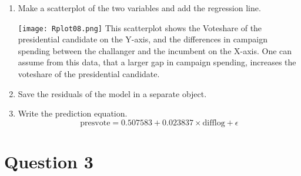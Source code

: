 \documentclass[12pt,letterpaper]{article}
\begin{document}
\begin{enumerate}
	\vspace{5cm}
		\item Make a scatterplot of the two variables and add the regression line. 
 
    \texttt{[image: Rplot08.png]}
This scatterplot shows the Voteshare of the presidential candidate on the Y-axis, and the differences in campaign spending between the challanger and the incumbent on the X-axis. One can assume from this data, that a larger gap in campaign spending, increases the voteshare of the presidential candidate. 
	\vspace{5cm}
		\item Save the residuals of the model in a separate object.	
 
\vspace{5cm}
		\item Write the prediction equation.
\begin{equation}
\text{presvote} = 0.507583 + 0.023837 \times \text{difflog} + \epsilon
\end{equation}
	\end{enumerate}
	
	\newpage	
\section*{Question 3}
\end{document}
